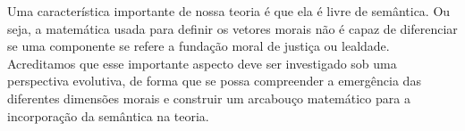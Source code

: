 Uma característica importante de nossa teoria é que ela é livre de
semântica.  Ou seja, a matemática usada para definir os vetores morais
não é capaz de diferenciar se uma componente se refere a fundação moral
de justiça ou lealdade. Acreditamos que esse importante aspecto deve ser
investigado sob uma perspectiva evolutiva, de forma que se possa compreender
a emergência das diferentes dimensões morais e construir um arcabouço
matemático para a incorporação da semântica na teoria.

